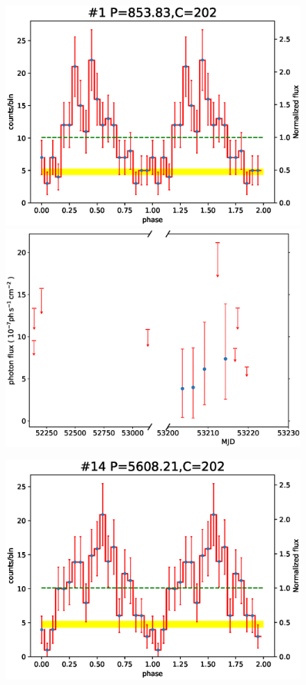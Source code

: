 \documentclass[fleqn,usenatbib]{mnras}
\begin{document}
\begin{figure}
\begin{minipage}[t]{0.45\textwidth}
\includegraphics[width=\textwidth]{./figure/LW/pfold_lc_324001.eps}
\includegraphics[width=\textwidth]{./figure/LW/324001_lc.eps}
\end{minipage}
\begin{minipage}[t]{0.45\textwidth}
\includegraphics[width=\textwidth]{./figure/LW/pfold_lc_324002.eps}

\end{minipage}
\end{figure}
\end{document}
